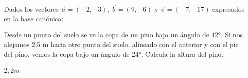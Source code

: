\documentclass[addpoints,spanish, 12pt,a4paper]{exam}
\begin{document}
        \begin{questions}
        
              \question Dados los vectores $\overrightarrow{a}=(-2, -3)$, $\overrightarrow{b}=(9, -6)$ y $\overrightarrow{c}=(-7, -17)$ expresados en la base canónica:

        
        \question[2] Desde un punto del suelo se ve la copa de un pino bajo un ángulo de 42°. Si nos alejamos 2,5 m hacia otro punto del suelo, alineado con el anterior y con el pie del pino, vemos la copa bajo un ángulo de 24°. Calcula la altura del pino. \begin{solution}
        $2,2 m$
        \end{solution}


\end{questions}
\end{document}
